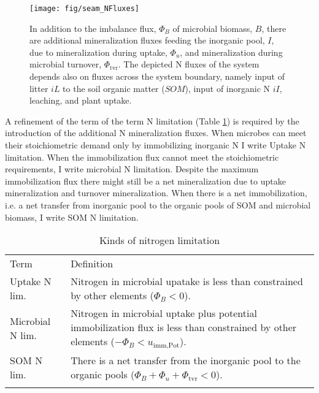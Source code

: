 \begin{figure}[t] \vspace*{2mm}
\begin{center}
\texttt{[image: fig/seam\_NFluxes]} 
\end{center}
\caption{
In addition to the imbalance flux, $\Phi_B$ of microbial biomass, $B$, there are
additional mineralization fluxes feeding the inorganic pool, $I$, due to
mineralization during uptake, $\Phi_u$, and mineralization 
during microbial turnover, $\Phi_{\operatorname{tvr}}$. The depicted N
fluxes of the system depends also on fluxes across the system boundary,
namely input of litter $iL$ to the soil organic matter ($SOM$), input of inorganic N $iI$, leaching, and
plant uptake.
\label{fig:seamNFluxes}}
\end{figure}

A refinement of the term of the term N limitation (Table
\ref{tab:NutrientLimDefs}) is required by the introduction of the additional N
mineralization fluxes.
When microbes can meet their stoichiometric demand only by immobilizing
inorganic N I write Uptake N limitation.
When the immobilization flux cannot meet the stoichiometric requirements, I
write microbial N limitation. Despite the maximum immobilization flux there
might still be a net mineralization due to uptake mineralization and turnover
mineralization.
When there is a net immobilization, i.e. a net transfer from inorganic pool to
the organic pools of SOM and microbial biomass, I write SOM N limitation.

\begin{table}[t]
\caption{Kinds of nitrogen limitation \label{tab:NutrientLimDefs}}
\centering
\begin{tabular}{lp{5.5cm}}
\tophline
Term &  Definition \\
\middlehline
Uptake N lim. & Nitrogen in microbial upatake is less than 
constrained by other elements (${\Phi_B < 0}$).
\\
Microbial N lim. & Nitrogen in microbial uptake plus potential
immobilization flux is less than constrained by other elements (${-\Phi_B <
u_{\operatorname{imm,Pot}}}$).
\\
SOM N lim. & There is a net transfer from the inorganic pool to
the organic pools (${\Phi_B+\Phi_u+\Phi_{\operatorname{tvr}}<0}$).
\\
\bottomhline
\end{tabular}
\end{table}
 


